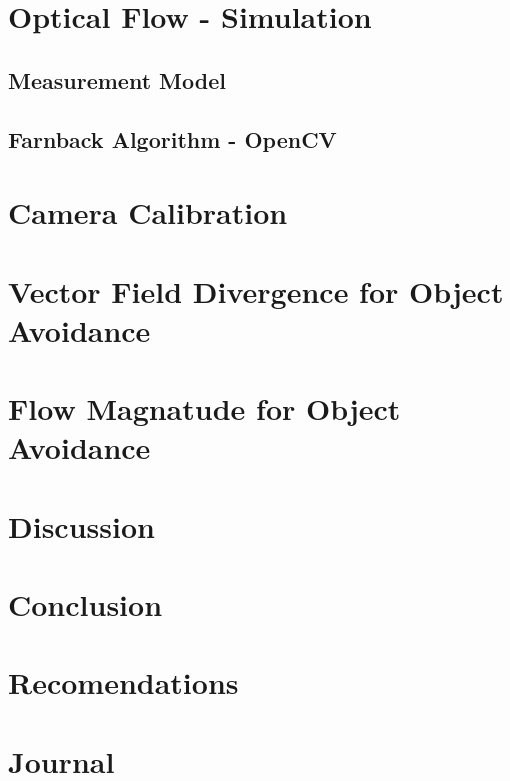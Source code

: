 \documentclass{UoNMCHA}
\numberwithin{equation}{section}
\begin{document}
\section{Optical Flow - Simulation}
\subsection{Measurement Model}
\subsection{Farnback Algorithm - OpenCV}

\newpage
\section{Camera Calibration}

\newpage
\section{Vector Field Divergence for Object Avoidance}

\newpage
\section{Flow Magnatude for Object Avoidance}

\newpage
\section{Discussion}

\newpage
\section{Conclusion}\label{sec:Conclusion}

\newpage
\section{Recomendations}

\newpage


\appendix
\newpage
\section{Journal}\label{app:Journal}
\end{document}
